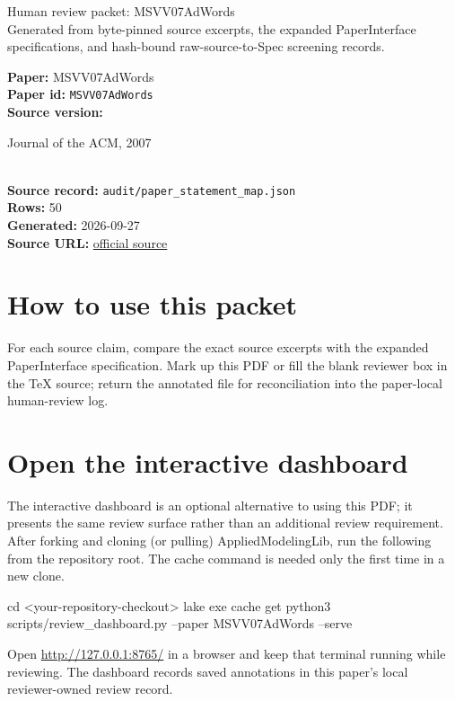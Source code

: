 \documentclass[10pt]{article}
\begin{document}
\fontsize{9}{10}\selectfont

\begin{center}
{\LARGE Human review packet: MSVV07AdWords}\\[0.35em]
\small Generated from byte-pinned source excerpts, the expanded PaperInterface
specifications, and hash-bound raw-source-to-Spec screening records.
\end{center}

\noindent\textbf{Paper:} MSVV07AdWords\\
\textbf{Paper id:} \texttt{MSVV07AdWords}\\
\textbf{Source version:} \parbox[t]{0.76\linewidth}{\raggedright Journal of the ACM, 2007}\\
\textbf{Source record:} \texttt{audit/paper\_statement\_map.json}\\
\textbf{Rows:} 50\\
\textbf{Generated:} 2026-09-27\\
\textbf{Source URL:} \href{https://people.eecs.berkeley.edu/~vazirani/pubs/adwords.pdf}{official source}





\section*{How to use this packet}
For each source claim, compare the exact source excerpts with the expanded
PaperInterface specification. Mark up this PDF or fill the blank reviewer box in the TeX source;
return the annotated file for reconciliation into the paper-local human-review
log.

\section*{Open the interactive dashboard}
The interactive dashboard is an optional alternative to using this PDF; it
presents the same review surface rather than an additional review requirement.
After forking and cloning (or pulling) AppliedModelingLib, run the following from the
repository root. The cache command is needed only the first time in a new clone.
\begin{ReviewVerbatim}
cd <your-repository-checkout>
lake exe cache get
python3 scripts/review_dashboard.py --paper MSVV07AdWords --serve
\end{ReviewVerbatim}
Open \url{http://127.0.0.1:8765/} in a browser and keep that terminal running
while reviewing. The dashboard records saved annotations in this paper's local
reviewer-owned review record.
\end{document}
